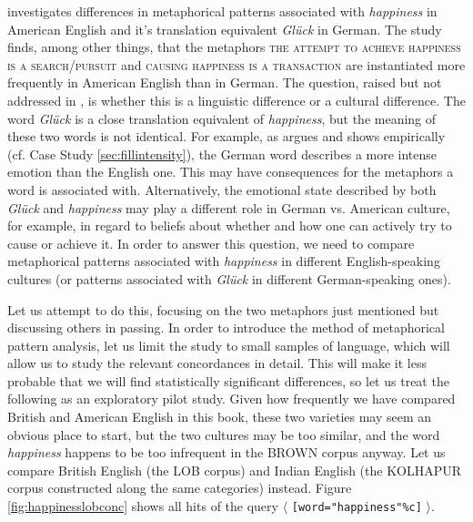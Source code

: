 \citet{stefanowitsch_happiness_2004} investigates differences in metaphorical patterns associated with \textit{happiness} in American English and it's translation equivalent \textit{Glück} in German. The study finds, among other things, that the metaphors \textsc{the attempt to achieve happiness is a search/pursuit} and \textsc{causing happiness is a transaction} are instantiated more frequently in American English than in German. The question, raised but not addressed in \citet{stefanowitsch_happiness_2004}, is whether this is a linguistic difference or a cultural difference. The word \textit{Glück} is a close translation equivalent of \textit{happiness}, but the meaning of these two words is not identical. For example, as \citet{goddard_semantic_1998} argues and \citet{stefanowitsch_happiness_2004} shows empirically (cf. Case Study \ref{sec:fillintensity}), the German word describes a more intense emotion than the English one. This may have consequences for the metaphors a word is associated with. Alternatively, the emotional state described by both \textit{Glück} and \textit{happiness} may play a different role in German vs. American culture, for example, in regard to beliefs about whether and how one can actively try to cause or achieve it. In order to answer this question, we need to compare metaphorical patterns associated with \textit{happiness} in different English-speaking cultures (or patterns associated with \textit{Glück} in different German-speaking ones).

Let us attempt to do this, focusing on the two metaphors just mentioned but discussing others in passing. In order to introduce the method of metaphorical pattern analysis, let us limit the study to small samples of language, which will allow us to study the relevant concordances in detail. This will make it less probable that we will find statistically significant differences, so let us treat the following as an exploratory pilot study. Given how frequently we have compared British and American English in this book, these two varieties may seem an obvious place to start, but the two cultures may be too similar, and the word \textit{happiness} happens to be too infrequent in the BROWN corpus anyway. Let us compare British English (the LOB corpus) and Indian English (the KOLHAPUR corpus constructed along the same categories) instead. Figure \ref{fig:happinesslobconc} shows all hits of the query $\langle$ \texttt{[word="happiness"\%c]} $\rangle$.

